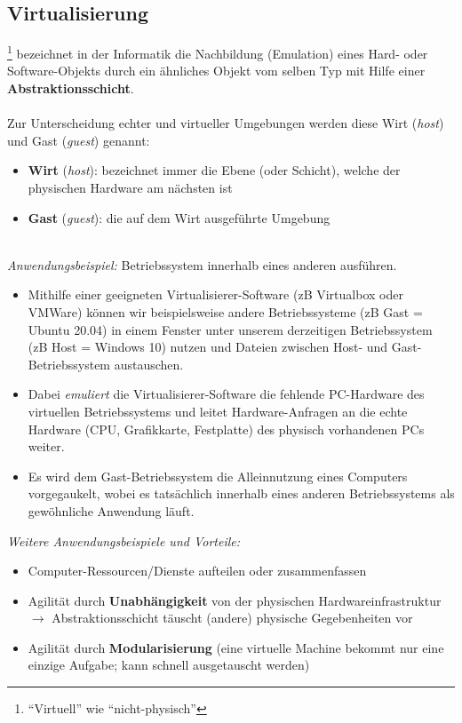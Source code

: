 \clearpage
\subsection{Virtualisierung}
\footnote{``Virtuell'' wie ``nicht-physisch''} bezeichnet in der Informatik die Nachbildung (Emulation) eines Hard- oder Software-Objekts durch ein ähnliches Objekt vom selben Typ mit Hilfe einer \textbf{Abstraktionsschicht}.
~\\~\\
Zur Unterscheidung echter und virtueller Umgebungen werden diese  Wirt (\textit{host}) und Gast (\textit{guest}) genannt:
\begin{itemize}
	\item \textbf{Wirt} (\textit{host}): bezeichnet immer die Ebene (oder Schicht), welche der physischen Hardware am nächsten ist
	\item \textbf{Gast} (\textit{guest}): die auf dem Wirt ausgeführte Umgebung
\end{itemize}
~\\
\textit{Anwendungsbeispiel:} Betriebssystem innerhalb eines anderen ausführen.
\begin{itemize}
	\item Mithilfe einer geeigneten Virtualisierer-Software (zB Virtualbox oder VMWare) können wir beispielsweise andere Betriebssysteme (zB Gast = Ubuntu 20.04) in einem Fenster unter unserem derzeitigen Betriebssystem (zB Host = Windows 10) nutzen und Dateien zwischen Host- und Gast-Betriebssystem austauschen.
\item Dabei \textit{emuliert} die Virtualisierer-Software die fehlende PC-Hardware des virtuellen Betriebssystems und leitet Hardware-Anfragen an die echte Hardware (CPU, Grafikkarte, Festplatte) des physisch vorhandenen PCs weiter.
\item Es wird dem Gast-Betriebssystem die Alleinnutzung eines Computers vorgegaukelt, wobei es tatsächlich innerhalb eines anderen Betriebssystems als gewöhnliche Anwendung läuft.
\end{itemize}
%
\textit{Weitere Anwendungsbeispiele und Vorteile:}
\begin{itemize}
	\item Computer-Ressourcen/Dienste aufteilen oder zusammenfassen
	\item Agilität durch \textbf{Unabhängigkeit} von der physischen Hardwareinfrastruktur\\
	$\to$ Abstraktionsschicht täuscht (andere) physische Gegebenheiten vor
	\item Agilität durch \textbf{Modularisierung} (eine virtuelle Machine bekommt nur eine einzige Aufgabe; kann schnell ausgetauscht werden)
\end{itemize}
